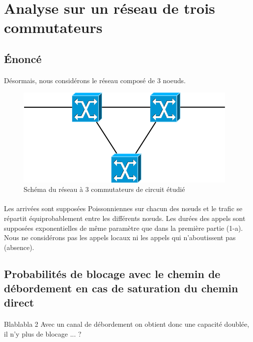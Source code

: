     \section{Analyse sur un réseau de trois commutateurs}
%
        \subsection{Énoncé}
%
            \paragraph{}
Désormais, nous considérons le réseau composé de 3 noeuds.
%
            \begin{figure}[h]
                \centering
                \includegraphics[scale=0.6]{RSC/1-2.png}
                \caption{ Schéma du réseau à 3 commutateurs de circuit étudié }
                \label{ Schema du reseau a 3 commutateurs de circuit }
            \end{figure}
%
            \paragraph{}
Les arrivées sont supposées Poissonniennes sur chacun des nœuds et le trafic se répartit équiprobablement entre les différents nœuds.
Les durées des appels sont supposées exponentielles de même paramètre que dans la première partie (1-a).
Nous ne considérons pas les appels locaux ni les appels qui n'aboutissent pas (absence).
%
%
    \clearpage
%
%
        \subsection{Probabilités de blocage avec le chemin de débordement en cas de saturation du chemin direct}
%
            \paragraph{}
Blablabla 2
Avec un canal de débordement on obtient donc une capacité doublée, il n'y plus de blocage ... ?
%
